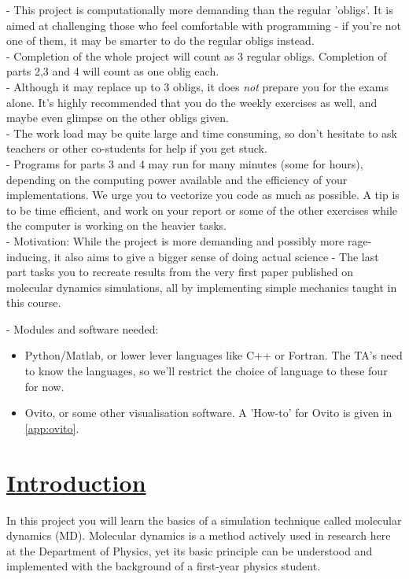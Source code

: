\documentclass[11pt,british,a4paper]{report}
\begin{document}
- This project is computationally more demanding than the regular 'obligs'. It is aimed at challenging those who feel comfortable with programming - if you're not one of them, it may be smarter to do the regular obligs instead.\\
- Completion of the whole project will count as 3 regular obligs. Completion of parts 2,3 and 4 will count as one oblig each.\\
- Although it may replace up to 3 obligs, it does \textit{not} prepare you for the exams alone. It's highly recommended that you do the weekly exercises as well, and maybe even glimpse on the other obligs given.\\
- The work load may be quite large and time consuming, so don't hesitate to ask teachers or other co-students for help if you get stuck.\\
- Programs for parts 3 and 4 may run for many minutes (some for hours), depending on the computing power available and the efficiency of your implementations. We urge you to vectorize you code as much as possible. A tip is to be time efficient, and work on your report or some of the other exercises while the computer is working on the heavier tasks.\\
- Motivation: While the project is more demanding and possibly more rage-inducing, it also aims to give a bigger sense of doing actual science - The last part tasks you to recreate results from the very first paper published on molecular dynamics simulations, all by implementing simple mechanics taught in this course.

- Modules and software needed:
\begin{itemize}
 \item Python/Matlab, or lower lever languages like C++ or Fortran. The TA's need to know the languages, so we'll restrict the choice of language to these four for now.
 \item Ovito, or some other visualisation software. A 'How-to' for Ovito is given in \vref{app:ovito}.
\end{itemize}


\newpage

\section{\underline{Introduction}}
In this project you will learn the basics of a simulation technique called molecular dynamics (MD). Molecular dynamics is a method actively used in research here at the Department of Physics, yet its basic principle can be understood and implemented with the background of a first-year physics student.
\end{document}
